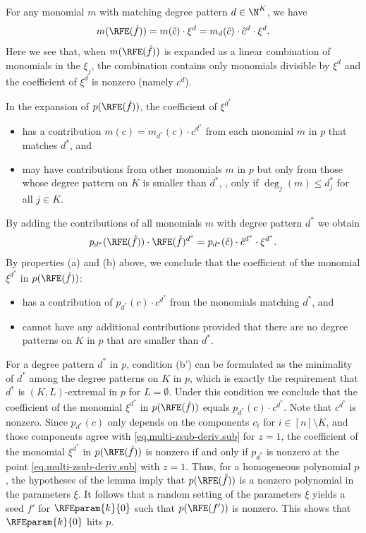 For any monomial \(m\) with matching degree pattern \(d \in \N^K\),
we have
\[
  m(\RFE(\hat{f}))
  =
  m(\hat{c}) \cdot \xi^{d}
  =
  m_{d}(\hat{c}) \cdot \hat{c}^{d} \cdot \xi^{d}.
\]
Here we see that,
when \(m(\RFE(\hat{f}))\) is expanded as a linear combination of monomials in
the \(\xi_j\),
the combination contains only monomials divisible by \(\xi^d\) and the coefficient of \(\xi^d\) is nonzero (namely $c^{d}$). 

In the expansion of \(p(\RFE(\hat{f}))\),
the coefficient of \(\xi^{d^*}\)
\begin{itemize}
  \item[(a)] has a contribution $m(c) = m_{d^*}(c) \cdot c^{d^*}$ from each
    monomial $m$ in $p$ that matches \(d^*\), and
  \item[(b)] may have contributions from other monomials $m$ in $p$
    but only from those whose degree pattern on $K$ is smaller than $d^*$,
    \ie, only if $\deg_j(m) \le d^*_j$ for all $j \in K$.
\end{itemize}
By adding the contributions of all monomials $m$ with degree pattern $d^*$ we obtain
\[ p_{d^*}(\RFE(\hat{f})) \cdot \RFE(\hat{f})^{d^*} = p_{d^*}(\hat{c}) \cdot \hat{c}^{d^*} \cdot \xi^{d^*}.\]
By properties (a) and (b) above,
we conclude that the coefficient of the monomial $\xi^{d^*}$ in
$p(\RFE(\hat{f}))$:
\begin{itemize}
  \item[(a')] has a contribution of $p_{d^*}(c) \cdot c^{d^*}$ from the
    monomials matching $d^*$, and
  \item[(b')] cannot have any additional contributions provided that there are
    no degree patterns on $K$ in $p$ that are smaller than $d^*$.
\end{itemize}
For a degree pattern $d^*$ in $p$,
condition (b') can be formulated as the minimality of $d^*$ among the degree
patterns on $K$ in $p$,
which is exactly the requirement that $d^*$ is $(K,L)$-extremal in $p$
for $L = \emptyset$.
Under this condition we conclude that the coefficient of the monomial
$\xi^{d^*}$ in $p(\RFE(\hat{f}))$ equals $p_{d^*}(c) \cdot c^{d^*}$.
Note that $c^{d^*}$ is nonzero.
Since $p_{d^*}(c)$ only depends on the components $c_i$
for $i \in [n] \setminus K$,
and those components agree with \eqref{eq.multi-zsub-deriv.sub} for $z=1$,
the coefficient of the monomial $\xi^{d^*}$ in $p(\RFE(\hat{f}))$ is nonzero
if and only if $p_{d^*}$ is nonzero at the point
\eqref{eq.multi-zsub-deriv.sub} with $z=1$.
Thus, for a homogeneous polynomial $p$, the hypotheses of the lemma imply that
$p(\RFE(\hat{f}))$ is a nonzero polynomial in the parameters $\xi$.
It follows that a random setting of the parameters $\xi$ yields a seed $f'$
for $\RFEparam{k}{0}$ such that $p(\RFE(f'))$ is nonzero.
This shows that $\RFEparam{k}{0}$ hits $p$.

